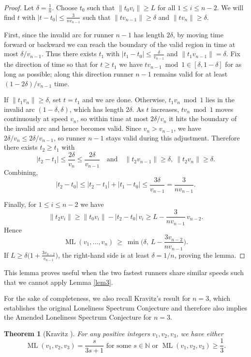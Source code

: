 \documentclass[11pt]{amsart}
\newtheorem{theorem}{Theorem}[section]
\DeclareMathOperator{\ML}{ML}
\begin{document}
\begin{proof}
Let $\delta=\frac{1}{n}$. Choose $t_0$ such that $\|t_0v_i\|\ge L$ for all $1\le i\le n-2$.
We will find $t$ with $|t-t_0|\le \frac{3}{nv_{n-1}}$ such that $\|tv_{n-1}\|\ge \delta$ and $\|tv_n\|\ge \delta$.

First, since the invalid arc for runner $n-1$ has length $2\delta$, by moving time forward or backward we can reach the boundary of the valid region in time at most $\delta/v_{n-1}$.
Thus there exists $t_1$ with $|t_1-t_0|\le \frac{\delta}{v_{n-1}}$ and $\|t_1v_{n-1}\|=\delta$.
Fix the direction of time so that for $t\ge t_1$ we have $t v_{n-1}\bmod 1\in[\delta,1-\delta]$ for as long as possible; along this direction runner $n-1$ remains valid for at least $(1-2\delta)/v_{n-1}$ time.

If $\|t_1v_n\|\ge \delta$, set $t=t_1$ and we are done.
Otherwise, $t_1v_n\bmod 1$ lies in the invalid arc $(1-\delta,\delta)$, which has length $2\delta$.
As $t$ increases, $t v_n\bmod 1$ moves continuously at speed $v_n$, so within time at most $2\delta/v_n$ it hits the boundary of the invalid arc and hence becomes valid.
Since $v_n>v_{n-1}$, we have $2\delta/v_n\le 2\delta/v_{n-1}$, so runner $n-1$ stays valid during this adjustment.
Therefore there exists $t_2\ge t_1$ with
\[
|t_2-t_1|\le \frac{2\delta}{v_n}\le \frac{2\delta}{v_{n-1}}
\quad\text{and}\quad
\|t_2v_{n-1}\|\ge\delta,\ \|t_2v_n\|\ge\delta.
\]
Combining,
\[
|t_2-t_0|\le |t_2-t_1|+|t_1-t_0|\le \frac{3\delta}{v_{n-1}}=\frac{3}{nv_{n-1}}.
\]

Finally, for $1\le i\le n-2$ we have
\[
\|t_2v_i\|\ge \|t_0v_i\|-|t_2-t_0|\,v_i
\ge L-\frac{3}{nv_{n-1}}\,v_{n-2}.
\]
Hence
\[
\ML(v_1,\ldots,v_n)\ \ge\ \min\!\Big(\delta,\ L-\frac{3v_{n-2}}{nv_{n-1}}\Big).
\]
If $L\ge \delta\big(1+\frac{3v_{n-2}}{v_{n-1}}\big)$, the right-hand side is at least $\delta=1/n$, proving the lemma.
\end{proof}


\par This lemma proves useful when the two fastest runners share similar speeds such that we cannot apply Lemma \ref{lem3}.

\par For the sake of completeness, we also recall Kravitz's result for $n = 3$, which establishes the original Loneliness Spectrum Conjecture and therefore also implies the Amended Loneliness Spectrum Conjecture for $n = 3$.

\begin{theorem}[Kravitz \cite{kravitz}]
\label{the5}
    For any positive integers $v_1,v_2,v_3$, we have either
    $$\ML(v_1,v_2,v_3) = \frac{s}{3s + 1} \text{ for some } s \in \mathbb{N} \text{ or } \ML(v_1,v_2,v_3) \geq \frac{1}{3}.$$
\end{theorem}
\end{document}

